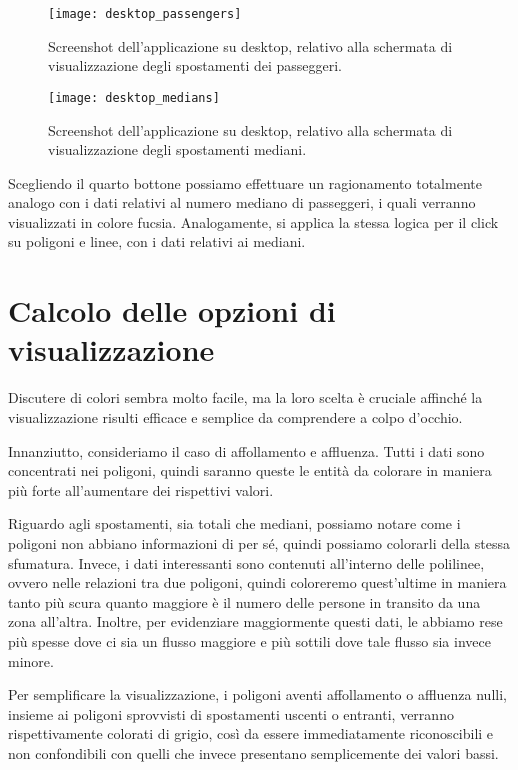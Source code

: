 \begin{figure}[H]
    \centering
    \texttt{[image: desktop\_passengers]}
    \caption[Screenshot degli spostamenti dei passeggeri su desktop]{Screenshot dell'applicazione su desktop, relativo alla schermata di visualizzazione degli spostamenti dei passeggeri.}
    \label{fig:desktop_passengers}
\end{figure}

\begin{figure}[H]
    \centering
    \texttt{[image: desktop\_medians]}
    \caption[Screenshot degli spostamenti mediani su desktop]{Screenshot dell'applicazione su desktop, relativo alla schermata di visualizzazione degli spostamenti mediani.}
    \label{fig:desktop_medians}
\end{figure}

Scegliendo il quarto bottone possiamo effettuare un ragionamento totalmente analogo con i dati relativi al numero mediano di passeggeri, i quali verranno visualizzati in colore fucsia. Analogamente, si applica la stessa logica per il click su poligoni e linee, con i dati relativi ai mediani.

\section{Calcolo delle opzioni di visualizzazione}
Discutere di colori sembra molto facile, ma la loro scelta è cruciale affinché la visualizzazione risulti efficace e semplice da comprendere a colpo d'occhio.

Innanziutto, consideriamo il caso di affollamento e affluenza. Tutti i dati sono concentrati nei poligoni, quindi saranno queste le entità da colorare in maniera più forte all'aumentare dei rispettivi valori.

Riguardo agli spostamenti, sia totali che mediani, possiamo notare come i poligoni non abbiano informazioni di per sé, quindi possiamo colorarli della stessa sfumatura. Invece, i dati interessanti sono contenuti all'interno delle polilinee, ovvero nelle relazioni tra due poligoni, quindi coloreremo quest'ultime in maniera tanto più scura quanto maggiore è il numero delle persone in transito da una zona all'altra. Inoltre, per evidenziare maggiormente questi dati, le abbiamo rese più spesse dove ci sia un flusso maggiore e più sottili dove tale flusso sia invece minore.

Per semplificare la visualizzazione, i poligoni aventi affollamento o affluenza nulli, insieme ai poligoni sprovvisti di spostamenti uscenti o entranti, verranno rispettivamente colorati di grigio, così da essere immediatamente riconoscibili e non confondibili con quelli che invece presentano semplicemente dei valori bassi.

